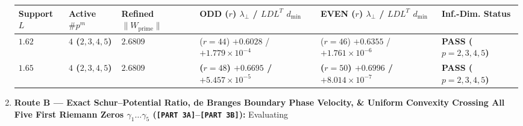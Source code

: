 \documentclass[
  11pt,
]{article}
\newcounter{none} %
\begin{document}
\begin{enumerate}
  {\def\LTcaptype{none} %
  \begin{longtable}[]{@{}
    >{\centering\arraybackslash}p{}
    >{\centering\arraybackslash}p{}
    >{\centering\arraybackslash}p{}
    >{\centering\arraybackslash}p{}
    >{\centering\arraybackslash}p{}
    >{\raggedright\arraybackslash}p{}@{}}
  \toprule\noalign{}
  \begin{minipage}[b]{\linewidth}\centering
  Support \(L\)
  \end{minipage} & \begin{minipage}[b]{\linewidth}\centering
  Active \(\#p^m\)
  \end{minipage} & \begin{minipage}[b]{\linewidth}\centering
  Refined \(\|W_{\text{prime}}\|\)
  \end{minipage} & \begin{minipage}[b]{\linewidth}\centering
  ODD (\(r\)) \(\lambda_\perp\) / \(LDL^T\) \(d_{\min}\)
  \end{minipage} & \begin{minipage}[b]{\linewidth}\centering
  EVEN (\(r\)) \(\lambda_\perp\) / \(LDL^T\) \(d_{\min}\)
  \end{minipage} & \begin{minipage}[b]{\linewidth}\raggedright
  Inf.-Dim. Status
  \end{minipage} \\
  \midrule\noalign{}
  \endhead
  \bottomrule\noalign{}
  \endlastfoot
  \(1.62\) & \textbf{\(4\) (\(2, 3, 4, 5\))} & \(2.6809\) & (\(r=44\))
  \(+0.6028\) / \(+1.779 \times 10^{-4}\) & (\(r=46\)) \(+0.6355\) /
  \(+1.761 \times 10^{-6}\) & \textbf{PASS (\(p=2,3,4,5\))} \\
  \textbf{\(1.65\)} & \textbf{\(4\) (\(2, 3, 4, 5\))} &
  \textbf{\(2.6809\)} & \textbf{(\(r=48\)) \(+0.6695\) /
  \(+5.457 \times 10^{-5}\)} & \textbf{(\(r=50\)) \(+0.6996\) /
  \(+8.014 \times 10^{-7}\)} & \textbf{PASS (\(p=2,3,4,5\))} \\
  \end{longtable}
  }
\item
  \textbf{Route B --- Exact Schur--Potential Ratio, de Branges Boundary
  Phase Velocity, \& Uniform Convexity Crossing All Five First Riemann
  Zeros \(\gamma_1 \dots \gamma_5\)
  (\texttt{{[}PART\ 3A{]}}--\texttt{{[}PART\ 3B{]}}):} Evaluating

\end{enumerate}
\end{document}
